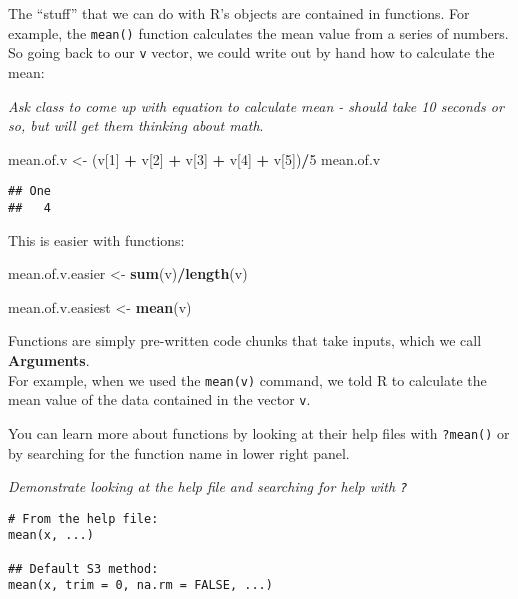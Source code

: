 \documentclass[]{article}
\newenvironment{Shaded}{\begin{snugshade}}{\end{snugshade}}
\newcommand{\KeywordTok}[1]{\textcolor[rgb]{0.13,0.29,0.53}{\textbf{#1}}}
\newcommand{\DecValTok}[1]{\textcolor[rgb]{0.00,0.00,0.81}{#1}}
\newcommand{\StringTok}[1]{\textcolor[rgb]{0.31,0.60,0.02}{#1}}
\newcommand{\OperatorTok}[1]{\textcolor[rgb]{0.81,0.36,0.00}{\textbf{#1}}}
\newcommand{\NormalTok}[1]{#1}
\begin{document}
The ``stuff'' that we can do with R's objects are contained in
functions. For example, the \texttt{mean()} function calculates the mean
value from a series of numbers. So going back to our \texttt{v} vector,
we could write out by hand how to calculate the mean:

\emph{Ask class to come up with equation to calculate mean - should take
10 seconds or so, but will get them thinking about math}.

\begin{Shaded}
\begin{Highlighting}[]
\NormalTok{mean.of.v <-}\StringTok{ }\NormalTok{(v[}\DecValTok{1}\NormalTok{] }\OperatorTok{+}\StringTok{ }\NormalTok{v[}\DecValTok{2}\NormalTok{] }\OperatorTok{+}\StringTok{ }\NormalTok{v[}\DecValTok{3}\NormalTok{] }\OperatorTok{+}\StringTok{ }\NormalTok{v[}\DecValTok{4}\NormalTok{] }\OperatorTok{+}\StringTok{ }\NormalTok{v[}\DecValTok{5}\NormalTok{])}\OperatorTok{/}\DecValTok{5}
\NormalTok{mean.of.v}
\end{Highlighting}
\end{Shaded}

\begin{verbatim}
## One 
##   4
\end{verbatim}

This is easier with functions:

\begin{Shaded}
\begin{Highlighting}[]
\NormalTok{mean.of.v.easier <-}\StringTok{ }\KeywordTok{sum}\NormalTok{(v)}\OperatorTok{/}\KeywordTok{length}\NormalTok{(v)}

\NormalTok{mean.of.v.easiest <-}\StringTok{ }\KeywordTok{mean}\NormalTok{(v)}
\end{Highlighting}
\end{Shaded}

Functions are simply pre-written code chunks that take inputs, which we
call \textbf{Arguments}.\\
For example, when we used the \texttt{mean(v)} command, we told R to
calculate the mean value of the data contained in the vector \texttt{v}.

You can learn more about functions by looking at their help files with
\texttt{?mean()} or by searching for the function name in lower right
panel.

\emph{Demonstrate looking at the help file and searching for help with
\texttt{?}}

\begin{verbatim}
# From the help file:
mean(x, ...)

## Default S3 method:
mean(x, trim = 0, na.rm = FALSE, ...)
\end{verbatim}
\end{document}
